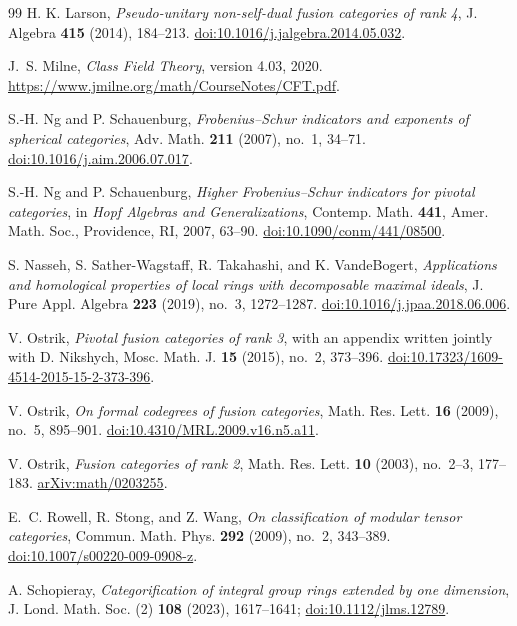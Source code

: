 \begin{thebibliography}{99}
H. K. Larson, \emph{Pseudo-unitary non-self-dual fusion categories of rank 4},
J. Algebra \textbf{415} (2014), 184--213.
\href{https://doi.org/10.1016/j.jalgebra.2014.05.032}{doi:10.1016/j.jalgebra.2014.05.032}.

J.~S. Milne, \emph{Class Field Theory}, version 4.03, 2020.
\url{https://www.jmilne.org/math/CourseNotes/CFT.pdf}.

S.-H. Ng and P. Schauenburg, \emph{Frobenius--Schur indicators and exponents of spherical categories},
Adv. Math. \textbf{211} (2007), no.~1, 34--71.
\href{https://doi.org/10.1016/j.aim.2006.07.017}{doi:10.1016/j.aim.2006.07.017}.

S.-H. Ng and P. Schauenburg, \emph{Higher Frobenius--Schur indicators for
pivotal categories}, in \emph{Hopf Algebras and Generalizations},
Contemp. Math. \textbf{441}, Amer. Math. Soc., Providence, RI, 2007, 63--90.
\href{https://doi.org/10.1090/conm/441/08500}{doi:10.1090/conm/441/08500}.

S. Nasseh, S. Sather-Wagstaff, R. Takahashi, and K. VandeBogert,
\emph{Applications and homological properties of local rings with
decomposable maximal ideals}, J. Pure Appl. Algebra \textbf{223} (2019),
no.~3, 1272--1287.
\href{https://doi.org/10.1016/j.jpaa.2018.06.006}{doi:10.1016/j.jpaa.2018.06.006}.

V. Ostrik, \emph{Pivotal fusion categories of rank 3}, with an appendix
written jointly with D. Nikshych, Mosc. Math. J. \textbf{15} (2015),
no.~2, 373--396.
\href{https://doi.org/10.17323/1609-4514-2015-15-2-373-396}{doi:10.17323/1609-4514-2015-15-2-373-396}.

V. Ostrik, \emph{On formal codegrees of fusion categories},
Math. Res. Lett. \textbf{16} (2009), no.~5, 895--901.
\href{https://doi.org/10.4310/MRL.2009.v16.n5.a11}{doi:10.4310/MRL.2009.v16.n5.a11}.

V. Ostrik, \emph{Fusion categories of rank 2},
Math. Res. Lett. \textbf{10} (2003), no.~2--3, 177--183.
\href{https://arxiv.org/abs/math/0203255}{arXiv:math/0203255}.\par

E.~C. Rowell, R. Stong, and Z. Wang, \emph{On classification of modular
 tensor categories}, Commun. Math. Phys. \textbf{292} (2009), no.~2, 343--389.
\href{https://doi.org/10.1007/s00220-009-0908-z}{doi:10.1007/s00220-009-0908-z}.

 A. Schopieray,
\emph{Categorification of integral group rings extended by one dimension},
J. Lond. Math. Soc. (2) \textbf{108} (2023), 1617--1641;
\href{https://doi.org/10.1112/jlms.12789}{doi:10.1112/jlms.12789}.



\end{thebibliography}
